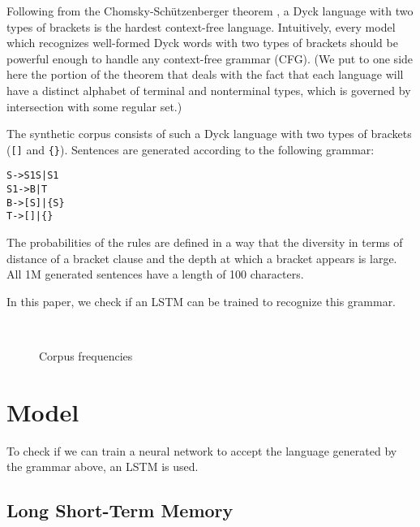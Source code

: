 \documentclass[11pt,a4paper]{article}
\newlength\figureheight
\newlength\figurewidth
\begin{document}
Following from the Chomsky-Sch\"utzenberger theorem \cite{chomsky1963algebraic, autebert1997context}, a Dyck language with two types of brackets is the hardest context-free language. Intuitively, every model which recognizes well-formed Dyck words with two types of brackets should be powerful enough to handle any context-free grammar (CFG). (We put to one side here the portion of the theorem that deals with the fact that each language will have a distinct alphabet of terminal and nonterminal types, which is governed by intersection with some regular set.)

The synthetic corpus consists of such a Dyck language with two types of brackets (\verb|[]| and \verb|{}|). Sentences are generated according to the following grammar:

\begin{alltt}
    S  -> S1 S | S1
    S1 -> B | T
    B  -> [ S ] | \{ S \}
    T  -> [ ] | \{ \}
\end{alltt}

The probabilities of the rules are defined in a way that the diversity in terms of distance of a bracket clause and the depth at which a bracket appears is large. All 1M generated sentences have a length of 100 characters.

In this paper, we check if an LSTM can be trained to recognize this grammar.

\setlength\figureheight{4cm}
\setlength\figurewidth{\linewidth}
\begin{figure}[ht]
    \\%
    \caption{Corpus frequencies}%
    \label{fig:corpus_frequencies}%
\end{figure}

\section{Model}

To check if we can train a neural network to accept the language generated by the grammar above, an LSTM is used.

\subsection{Long Short-Term Memory}
\end{document}
